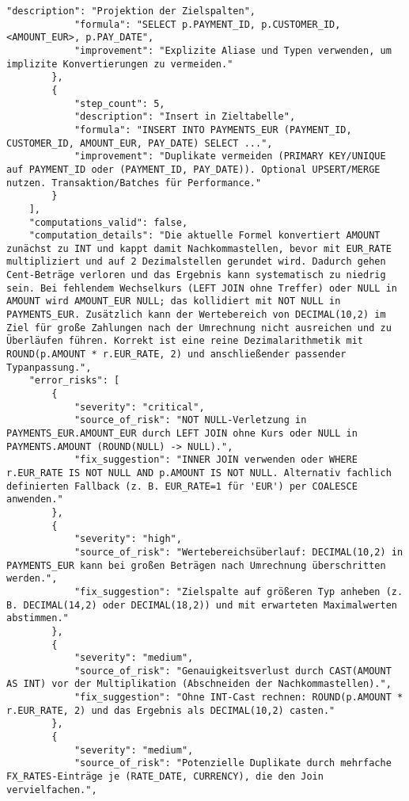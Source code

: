 \begin{lstlisting}[caption={Ausgabe: GPT-5 Anwendungsfall 4 Robustheitsdurchlauf},label={gpt_case4_prompt3}]
            "description": "Projektion der Zielspalten",
            "formula": "SELECT p.PAYMENT_ID, p.CUSTOMER_ID, <AMOUNT_EUR>, p.PAY_DATE",
            "improvement": "Explizite Aliase und Typen verwenden, um implizite Konvertierungen zu vermeiden."
        },
        {
            "step_count": 5,
            "description": "Insert in Zieltabelle",
            "formula": "INSERT INTO PAYMENTS_EUR (PAYMENT_ID, CUSTOMER_ID, AMOUNT_EUR, PAY_DATE) SELECT ...",
            "improvement": "Duplikate vermeiden (PRIMARY KEY/UNIQUE auf PAYMENT_ID oder (PAYMENT_ID, PAY_DATE)). Optional UPSERT/MERGE nutzen. Transaktion/Batches für Performance."
        }
    ],
    "computations_valid": false,
    "computation_details": "Die aktuelle Formel konvertiert AMOUNT zunächst zu INT und kappt damit Nachkommastellen, bevor mit EUR_RATE multipliziert und auf 2 Dezimalstellen gerundet wird. Dadurch gehen Cent-Beträge verloren und das Ergebnis kann systematisch zu niedrig sein. Bei fehlendem Wechselkurs (LEFT JOIN ohne Treffer) oder NULL in AMOUNT wird AMOUNT_EUR NULL; das kollidiert mit NOT NULL in PAYMENTS_EUR. Zusätzlich kann der Wertebereich von DECIMAL(10,2) im Ziel für große Zahlungen nach der Umrechnung nicht ausreichen und zu Überläufen führen. Korrekt ist eine reine Dezimalarithmetik mit ROUND(p.AMOUNT * r.EUR_RATE, 2) und anschließender passender Typanpassung.",
    "error_risks": [
        {
            "severity": "critical",
            "source_of_risk": "NOT NULL-Verletzung in PAYMENTS_EUR.AMOUNT_EUR durch LEFT JOIN ohne Kurs oder NULL in PAYMENTS.AMOUNT (ROUND(NULL) -> NULL).",
            "fix_suggestion": "INNER JOIN verwenden oder WHERE r.EUR_RATE IS NOT NULL AND p.AMOUNT IS NOT NULL. Alternativ fachlich definierten Fallback (z. B. EUR_RATE=1 für 'EUR') per COALESCE anwenden."
        },
        {
            "severity": "high",
            "source_of_risk": "Wertebereichsüberlauf: DECIMAL(10,2) in PAYMENTS_EUR kann bei großen Beträgen nach Umrechnung überschritten werden.",
            "fix_suggestion": "Zielspalte auf größeren Typ anheben (z. B. DECIMAL(14,2) oder DECIMAL(18,2)) und mit erwarteten Maximalwerten abstimmen."
        },
        {
            "severity": "medium",
            "source_of_risk": "Genauigkeitsverlust durch CAST(AMOUNT AS INT) vor der Multiplikation (Abschneiden der Nachkommastellen).",
            "fix_suggestion": "Ohne INT-Cast rechnen: ROUND(p.AMOUNT * r.EUR_RATE, 2) und das Ergebnis als DECIMAL(10,2) casten."
        },
        {
            "severity": "medium",
            "source_of_risk": "Potenzielle Duplikate durch mehrfache FX_RATES-Einträge je (RATE_DATE, CURRENCY), die den Join vervielfachen.",

\end{lstlisting}
